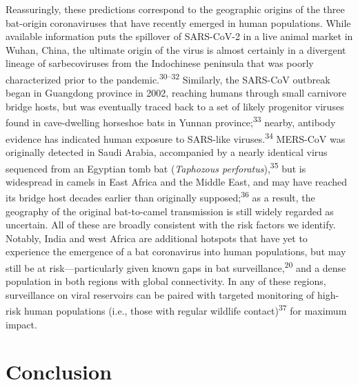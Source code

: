 \documentclass[11pt]{article}
\begin{document}
Reassuringly, these predictions correspond to the geographic origins of
the three bat-origin coronaviruses that have recently emerged in human
populations. While available information puts the spillover of
SARS-CoV-2 in a live animal market in Wuhan, China, the ultimate origin
of the virus is almost certainly in a divergent lineage of
sarbecoviruses from the Indochinese peninsula that was poorly
characterized prior to the pandemic.\textsuperscript{30--32} Similarly,
the SARS-CoV outbreak began in Guangdong province in 2002, reaching
humans through small carnivore bridge hosts, but was eventually traced
back to a set of likely progenitor viruses found in cave-dwelling
horseshoe bats in Yunnan province;\textsuperscript{33} nearby, antibody
evidence has indicated human exposure to SARS-like
viruses.\textsuperscript{34} MERS-CoV was originally detected in Saudi
Arabia, accompanied by a nearly identical virus sequenced from an
Egyptian tomb bat (\emph{Taphozous perforatus}),\textsuperscript{35} but
is widespread in camels in East Africa and the Middle East, and may have
reached its bridge host decades earlier than originally
supposed;\textsuperscript{36} as a result, the geography of the original
bat-to-camel transmission is still widely regarded as uncertain. All of
these are broadly consistent with the risk factors we identify. Notably,
India and west Africa are additional hotspots that have yet to
experience the emergence of a bat coronavirus into human populations,
but may still be at risk---particularly given known gaps in bat
surveillance,\textsuperscript{20} and a dense population in both regions
with global connectivity. In any of these regions, surveillance on viral
reservoirs can be paired with targeted monitoring of high-risk human
populations (i.e., those with regular wildlife
contact)\textsuperscript{37} for maximum impact.

\hypertarget{conclusion}{%
\section{Conclusion}\label{conclusion}}
\end{document}
